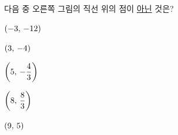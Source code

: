\noindent\begin{minipage}[t]{0.58\linewidth}\vspace{0pt}\raggedright 다음 중 오른쪽 그림의 직선 위의 점이 \underline{아닌} 것은?\end{minipage}\hfill\begin{minipage}[t]{0.4\linewidth}\vspace{0pt}\centering \resizebox{\ifdim\width>\linewidth\linewidth\else\width\fi}{!}{}\end{minipage}\par
\begin{choicesii}{\rule[-3ex]{0pt}{8ex}$(-3,\mkern3mu -12)$}{\rule[-3ex]{0pt}{8ex}$(3,\mkern3mu -4)$}{\rule[-3ex]{0pt}{8ex}$\left(5,\mkern3mu -\dfrac{4}{3}\right)$}{\rule[-3ex]{0pt}{8ex}$\left(8,\mkern3mu \dfrac{8}{3}\right)$}{\rule[-3ex]{0pt}{8ex}$(9,\mkern3mu 5)$}\end{choicesii}
